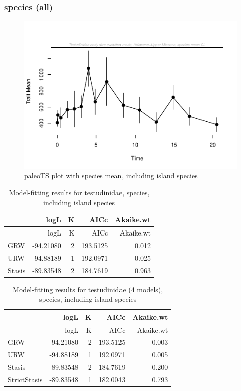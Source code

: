 \documentclass[]{article}
\begin{document}
\newpage

\subsubsection{species (all)}\label{species-all}

\begin{figure}[htbp]
\centering
\includegraphics{MA_JJ_files/figure-latex/paleoTS plot with species mean, including island species-1.pdf}
\caption{paleoTS plot with species mean, including island species}
\end{figure}

\begin{longtable}[]{@{}lrrrr@{}}
\caption{Model-fitting results for testudinidae, species, including
island species}\tabularnewline
\toprule
& logL & K & AICc & Akaike.wt\tabularnewline
\midrule
\endfirsthead
\toprule
& logL & K & AICc & Akaike.wt\tabularnewline
\midrule
\endhead
GRW & -94.21080 & 2 & 193.5125 & 0.012\tabularnewline
URW & -94.88189 & 1 & 192.0971 & 0.025\tabularnewline
Stasis & -89.83548 & 2 & 184.7619 & 0.963\tabularnewline
\bottomrule
\end{longtable}

\begin{longtable}[]{@{}lrrrr@{}}
\caption{Model-fitting results for testudinidae (4 models), species,
including island species}\tabularnewline
\toprule
& logL & K & AICc & Akaike.wt\tabularnewline
\midrule
\endfirsthead
\toprule
& logL & K & AICc & Akaike.wt\tabularnewline
\midrule
\endhead
GRW & -94.21080 & 2 & 193.5125 & 0.003\tabularnewline
URW & -94.88189 & 1 & 192.0971 & 0.005\tabularnewline
Stasis & -89.83548 & 2 & 184.7619 & 0.200\tabularnewline
StrictStasis & -89.83548 & 1 & 182.0043 & 0.793\tabularnewline
\bottomrule
\end{longtable}
\end{document}

